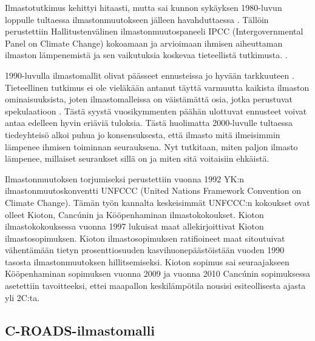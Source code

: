 \documentclass[finnish,12pt,a4paper,pdftex]{article}
\begin{document}
\begin{onehalfspacing}
Ilmastotutkimus kehittyi hitaasti, mutta sai kunnon sykäyksen 1980-luvun loppulle tultaessa ilmastonmuutokseen jälleen havahduttaessa  \cite{AmericanInstituteofPhysics}. Tällöin perustettiin Hallitustenvälinen ilmastonmuutospaneeli IPCC (Intergovernmental Panel on Climate Change) kokoamaan ja arvioimaan ihmisen aiheuttaman ilmaston lämpenemistä ja sen vaikutuksia koskevaa tieteellistä tutkimusta. \cite{IPCChistory}. 

1990-luvulla ilmastomallit olivat päässeet ennusteissa jo hyvään tarkkuuteen \cite{AmericanInstituteofPhysics}. Tieteellinen tutkimus ei ole vieläkään antanut täyttä varmuutta kaikista ilmaston ominaisuuksista, joten ilmastomalleissa on väistämättä osia, jotka perustuvat spekulaatioon \cite{CroadsFlightSimulator2011}. Tästä syystä vuosikymmenten päähän ulottuvat ennusteet voivat antaa edelleen hyvin eriäviä tuloksia. Tästä huolimatta 2000-luvulle tultaessa tiedeyhteisö alkoi puhua jo konsensuksesta, että ilmasto mitä ilmeisimmin lämpenee ihmisen toiminnan seurauksena. Nyt tutkitaan, miten paljon ilmasto lämpenee, millaiset seuraukset sillä on ja miten sitä voitaisiin ehkäistä. \cite{AmericanInstituteofPhysics}

Ilmastonmuutoksen torjumiseksi perustettiin vuonna 1992 YK:n ilmastonmuutoskonventti UNFCCC (United Nations Framework Convention on Climate Change). Tämän työn kannalta keskeisimmät UNFCCC:n kokoukset ovat olleet Kioton, Cancúnin ja Kööpenhaminan ilmastokokoukset. Kioton ilmastokokouksessa vuonna 1997 lukuisat maat allekirjoittivat Kioton ilmastosopimuksen. Kioton ilmastosopimuksen ratifioineet maat sitoutuivat vähentämään tietyn prosenttiosuuden kasvihuonepäästöistään vuoden 1990 tasosta ilmastonmuutoksen hillitsemiseksi. Kioton sopimus sai seuraajakseen Kööpenhaminan sopimuksen vuonna 2009 ja vuonna 2010 Cancúnin sopimuksessa asetettiin tavoitteeksi, ettei maapallon keskilämpötila nousisi esiteollisesta ajasta yli 2\degree C:ta. \cite{UNFCCC} 

\subsection{C-ROADS-ilmastomalli \label{ilmasto:croads}}


\end{onehalfspacing}
\end{document}
